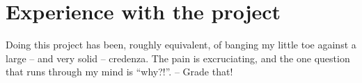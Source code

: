 \section{Experience with the project}
Doing this project has been, roughly equivalent, of banging my little toe against a large -- and very solid -- credenza. The pain is excruciating, and the one question that runs through my mind is ``why?!''. -- Grade that!